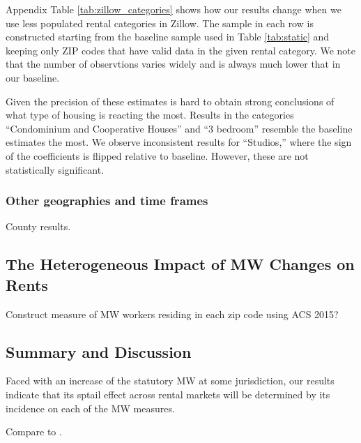 Appendix Table \ref{tab:zillow_categories} shows how our results change when we 
use less populated rental categories in Zillow.
The sample in each row is constructed starting from the baseline sample used in 
Table \ref{tab:static} and keeping only ZIP codes that have valid data in the 
given rental category.
We note that the number of observtions varies widely and is always much lower
that in our baseline.

Given the precision of these estimates is hard to obtain strong conclusions of
what type of housing is reacting the most.
Results in the categories ``Condominium and Cooperative Houses'' and ``3 bedroom''
resemble the baseline estimates the most.
We observe inconsistent results for ``Studios,'' where the sign of the coefficients
is flipped relative to baseline.
However, these are not statistically significant.

\subsubsection*{Other geographies and time frames}

County results.

\subsection{The Heterogeneous Impact of MW Changes on Rents}
\label{sec:heterogeneity_results}

Construct measure of MW workers residing in each zip code using ACS 2015?

\subsection{Summary and Discussion}
\label{sec:results_discussion}

Faced with an increase of the statutory MW at some jurisdiction, our results
indicate that its sptail effect across rental markets will be determined by 
its incidence on each of the MW measures.


Compare to \textcite{Yamagishi2019}.
